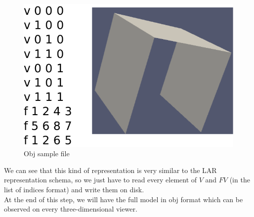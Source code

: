 \begin{figure}[htb] %
   \centering
   \includegraphics[width=0.40\linewidth]{images/objSample.png}
   \caption{Obj sample file}
   \label{fig:objSample}
\end{figure}

We can see that this kind of representation is very similar to the LAR representation schema, so we just have to read every element of $V$ and $FV$ (in the list of indices format) and write them on disk.\\

At the end of this step, we will have the full model in obj format which can be observed on every three-dimensional viewer.